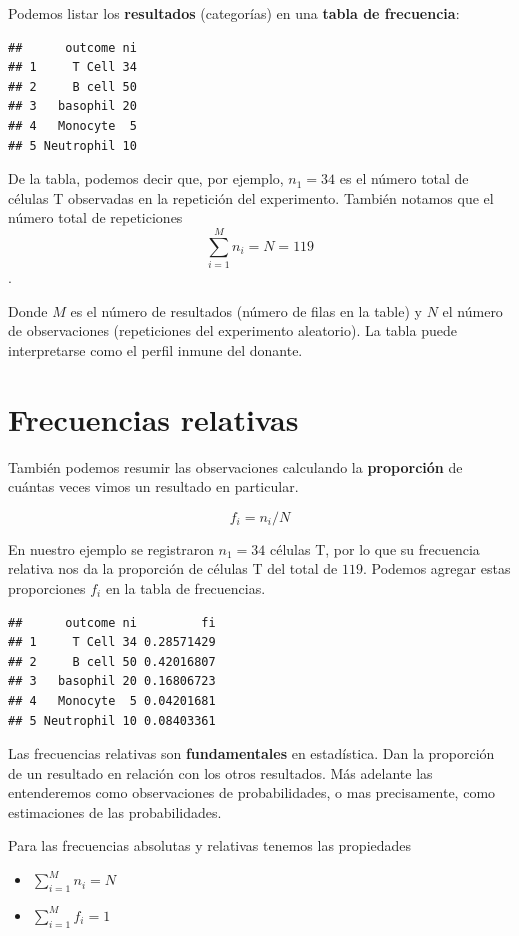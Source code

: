 \documentclass[
]{book}
\providecommand{\tightlist}{%
  \setlength{\itemsep}{0pt}\setlength{\parskip}{0pt}}
\begin{document}
Podemos listar los \textbf{resultados} (categorías) en una \textbf{tabla de frecuencia}:

\begin{verbatim}
##      outcome ni
## 1     T Cell 34
## 2     B cell 50
## 3   basophil 20
## 4   Monocyte  5
## 5 Neutrophil 10
\end{verbatim}

De la tabla, podemos decir que, por ejemplo, \(n_1=34\) es el número total de células T observadas en la repetición del experimento. También notamos que el número total de repeticiones \[\sum_{i=1}^M n_i=N=119\].

Donde \(M\) es el número de resultados (número de filas en la table) y \(N\) el número de observaciones (repeticiones del experimento aleatorio). La tabla puede interpretarse como el perfil inmune del donante.

\hypertarget{frecuencias-relativas}{%
\section{Frecuencias relativas}\label{frecuencias-relativas}}

También podemos resumir las observaciones calculando la \textbf{proporción} de cuántas veces vimos un resultado en particular.

\[f_i=n_i/N\]

En nuestro ejemplo se registraron \(n_1=34\) células T, por lo que su frecuencia relativa nos da la proporción de células T del total de \(119\). Podemos agregar estas proporciones \(f_i\) en la tabla de frecuencias.

\begin{verbatim}
##      outcome ni         fi
## 1     T Cell 34 0.28571429
## 2     B cell 50 0.42016807
## 3   basophil 20 0.16806723
## 4   Monocyte  5 0.04201681
## 5 Neutrophil 10 0.08403361
\end{verbatim}

Las frecuencias relativas son \textbf{fundamentales} en estadística. Dan la proporción de un resultado en relación con los otros resultados. Más adelante las entenderemos como observaciones de probabilidades, o mas precisamente, como estimaciones de las probabilidades.

Para las frecuencias absolutas y relativas tenemos las propiedades

\begin{itemize}
\tightlist
\item
  \(\sum_{i=1}^M n_i = N\)
\item
  \(\sum_{i=1}^M f_i = 1\)
\end{itemize}
\end{document}

